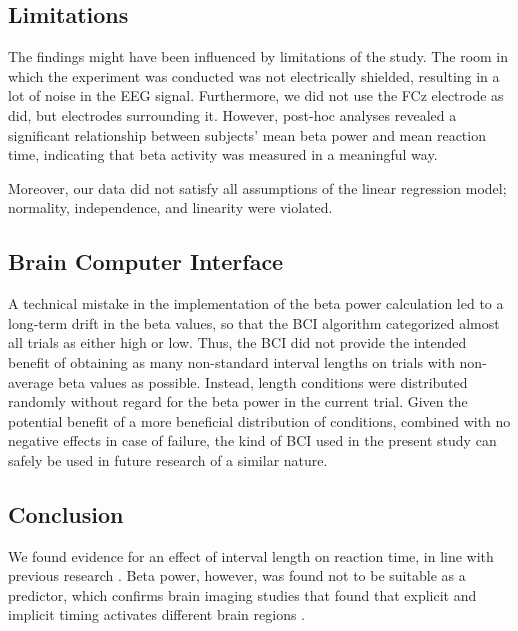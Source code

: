 \documentclass[man,floatsintext]{apa6} %
\begin{document}
\subsection{Limitations}
The findings might have been influenced by limitations of the
study. The room in which the experiment was conducted was not
electrically shielded, resulting in a lot of noise in the EEG
signal. Furthermore, we did not use the FCz electrode as
 did, but electrodes surrounding
it. However, post-hoc analyses revealed a significant relationship
between subjects' mean beta power and mean reaction time, indicating
that beta activity was measured in a meaningful way.

Moreover, our data did not satisfy all assumptions of the linear
regression model; normality, independence, and linearity were
violated.

\subsection{Brain Computer Interface}
A technical mistake in the implementation of the beta power
calculation led to a long-term drift in the beta values, so that the
BCI algorithm categorized almost all trials as either high or
low. Thus, the BCI did not provide the intended benefit of obtaining
as many non-standard interval lengths on trials with non-average beta
values as possible. Instead, length conditions were distributed
randomly without regard for the beta power in the current trial.
Given the potential benefit of a more beneficial distribution of
conditions, combined with no negative effects in case of failure, the
kind of BCI used in the present study can safely be used in future
research of a similar nature.

\subsection{Conclusion}
We found evidence for an effect of interval length on reaction time,
in line with previous research \cite{naatanen_diminishing_1970,
  karlin_reaction_1959, drazin_effects_1961,
  grosjean_timing_2001}. Beta power, however, was found not to be
suitable as a predictor, which confirms brain imaging studies that
found that explicit and implicit timing activates different brain
regions \cite{coull_dissociating_2008}.



\end{document}
